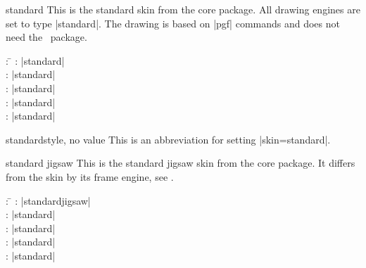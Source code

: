 \begin{docSkin}{standard}
  This is the standard skin from the core package. All drawing engines
  are set to type |standard|. The drawing is based on |pgf| commands and
  does not need the \tikzname\ package.
\begin{tcolorbox}[skintable=standard]
  \begin{tabbing}
    : \=\kill
    :           \> |standard|\\
    : \> |standard|\\ 
    :        \> |standard|\\
    :    \> |standard|\\
    :           \> |standard|
  \end{tabbing}
\end{tcolorbox}
\end{docSkin}

\begin{docTcbKey}{standard}{}{style, no value}
  This is an abbreviation for setting |skin=standard|.
\end{docTcbKey}

\begin{dispExample}
\end{dispExample}

\clearpage

\begin{docSkin}{standard jigsaw}
  This is the standard jigsaw skin from the core package. It differs from
  the skin  by its frame engine, see .
\begin{tcolorbox}[skintable=standard jigsaw]
  \begin{tabbing}
    : \=\kill
    :           \> |standardjigsaw|\\
    : \> |standard|\\ 
    :        \> |standard|\\
    :    \> |standard|\\
    :           \> |standard|
  \end{tabbing}
\end{tcolorbox}
\end{docSkin}

